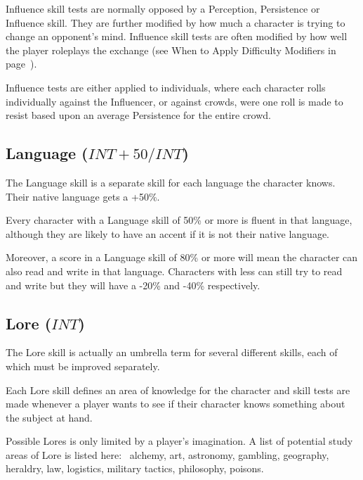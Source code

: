 Influence skill tests are normally opposed by a Perception, Persistence or Influence skill. They are further modified by how much a character is trying to change an opponent’s mind. Influence skill tests are often modified by how well the player roleplays the exchange (see When to Apply Difficulty Modifiers in page~\pageref{ssec:when-to-apply-difficulty-modifies}).

Influence tests are either applied to individuals, where each character rolls individually against the Influencer, or against crowds, were one roll is made to resist based upon an average Persistence for the entire crowd.


\subsection{Language ($INT+50/INT$)}
The Language skill is a separate skill for each language the character knows. Their native language gets a +50\%.

Every character with a Language skill of 50\% or more is fluent in that language, although they are likely to have an accent if it is not their native language. 

Moreover, a score in a Language skill of 80\% or more will mean the character can also read and write in that language. Characters with less can still try to read and write but they will have a -20\% and -40\% respectively.


\subsection{Lore ($INT$)}
The Lore skill is actually an umbrella term for several different skills, each of which must be improved separately. 

Each Lore skill defines an area of knowledge for the character and skill tests are made whenever a player wants to see if their character knows something about the subject at hand. 

Possible Lores is only limited by a player’s imagination. A list of potential study areas of Lore is listed here:  alchemy, art, astronomy, gambling, geography, heraldry, law, logistics, military tactics, philosophy, poisons.

